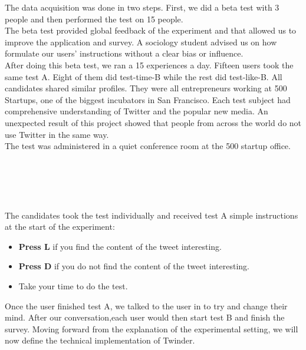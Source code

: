 The data acquisition was done in two steps. First, we did a beta test with 3 people and then performed the test on 15 people. \\
The beta test provided global feedback of the experiment and that allowed us to improve the application and survey. A sociology student advised us on how formulate our users' instructions without a clear bias or influence. \\
After doing this beta test, we ran a 15 experiences a day. Fifteen users took the same test A. Eight of them did test-time-B while the rest did test-like-B. All candidates shared similar profiles. They were all entrepreneurs working at 500 Startups, one of the biggest incubators in San Francisco. Each test subject had comprehensive understanding of Twitter and the popular new media. An unexpected result of this project showed that people from across the world do not use Twitter in the same way.\\
The test was administered in a quiet conference room at the 500 startup office. \\ \\ \\ \\ \\ \\
The candidates took the test individually and received test A simple instructions at the start of the experiment:

\begin{itemize}
  \item \textbf{Press L} if you find the content of the tweet interesting.
  \item \textbf{Press D} if you do not find the content of the tweet interesting.
  \item Take your time to do the test.
\end{itemize}

 


Once the user finished test A, we talked to the user in to try and change their mind. After our conversation,each user would then start test B and finish the survey.
Moving forward from the explanation of the experimental setting, we will now define the technical implementation of Twinder.
